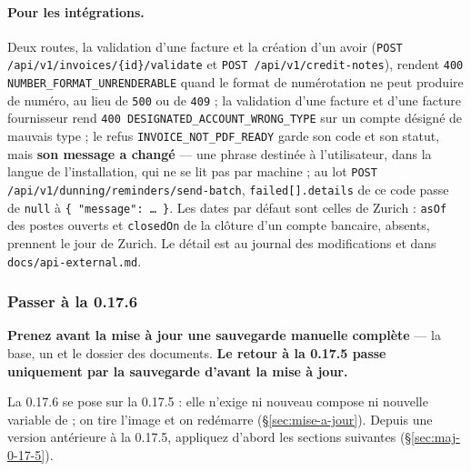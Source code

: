 \documentclass[a4paper,11pt,oneside]{article}
\begin{document}
\begin{sloppypar}
\paragraph{Pour les intégrations.} Deux routes, la validation d'une facture et la création d'un avoir (\texttt{POST /api/v1/\allowbreak invoices/\allowbreak\{id\}/\allowbreak validate} et \texttt{POST /api/v1/\allowbreak credit-notes}), rendent \texttt{400 NUMBER\_FORMAT\_UNRENDERABLE} quand le format de numérotation ne peut produire de numéro, au lieu de \texttt{500} ou de \texttt{409} ; la validation d'une facture et d'une facture fournisseur rend \texttt{400 DESIGNATED\_ACCOUNT\_WRONG\_TYPE} sur un compte désigné de mauvais type ; le refus \texttt{INVOICE\_NOT\_PDF\_READY} garde son code et son statut, mais \textbf{son message a changé} --- une phrase destinée à l'utilisateur, dans la langue de l'installation, qui ne se lit pas par machine ; au lot \texttt{POST /api/v1/\allowbreak dunning/\allowbreak reminders/\allowbreak send-batch}, \texttt{failed[].details} de ce code passe de \texttt{null} à \texttt{\{ "message": \ldots\ \}}. Les dates par défaut sont celles de Zurich : \texttt{asOf} des postes ouverts et \texttt{closedOn} de la clôture d'un compte bancaire, absents, prennent le jour de Zurich. Le détail est au journal des modifications et dans \texttt{docs/api-external.md}.
\end{sloppypar}

\fussy

\subsubsection{Passer à la 0.17.6}\label{sec:maj-0-17-6}
\sloppy

\textbf{Prenez avant la mise à jour une sauvegarde manuelle complète} --- la base, un  et le dossier des documents. \textbf{Le retour à la 0.17.5 passe uniquement par la sauvegarde d'avant la mise à jour.}

La 0.17.6 se pose sur la 0.17.5 : elle n'exige ni nouveau compose ni nouvelle variable de  ; on tire l'image et on redémarre (\S\ref{sec:mise-a-jour}). Depuis une version antérieure à la 0.17.5, appliquez d'abord les sections suivantes (\S\ref{sec:maj-0-17-5}).
\end{document}
